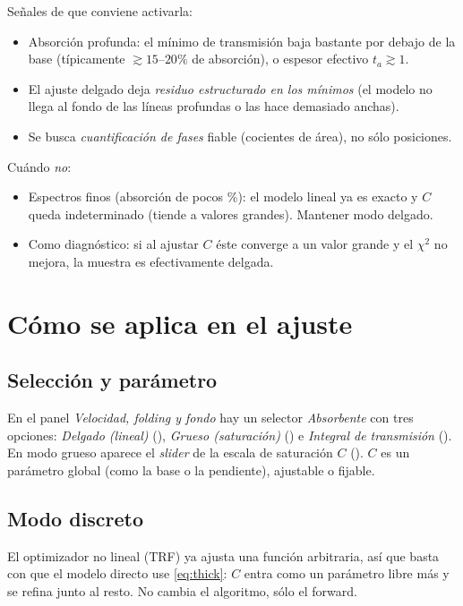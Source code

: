Señales de que conviene activarla:
\begin{itemize}[leftmargin=*]
  \item Absorción profunda: el mínimo de transmisión baja bastante por debajo de
        la base (típicamente $\gtrsim 15$–$20\%$ de absorción), o espesor efectivo
        $t_a\gtrsim 1$.
  \item El ajuste delgado deja \emph{residuo estructurado en los mínimos} (el
        modelo no llega al fondo de las líneas profundas o las hace demasiado
        anchas).
  \item Se busca \emph{cuantificación de fases} fiable (cocientes de área), no
        sólo posiciones.
\end{itemize}
Cuándo \emph{no}:
\begin{itemize}[leftmargin=*]
  \item Espectros finos (absorción de pocos \%): el modelo lineal ya es exacto y
        $C$ queda indeterminado (tiende a valores grandes). Mantener modo delgado.
  \item Como diagnóstico: si al ajustar $C$ éste converge a un valor grande y el
        $\chi^2$ no mejora, la muestra es efectivamente delgada.
\end{itemize}

\section{Cómo se aplica en el ajuste}

\subsection{Selección y parámetro}
En el panel \emph{Velocidad, folding y fondo} hay un selector \emph{Absorbente}
con tres opciones: \emph{Delgado (lineal)} (), \emph{Grueso (saturación)}
() e \emph{Integral de transmisión} (). En modo
grueso aparece el \emph{slider} de la escala de saturación $C$
(). $C$ es un parámetro global
(como la base o la pendiente), ajustable o fijable.

\subsection{Modo discreto}
El optimizador no lineal (TRF) ya ajusta una función arbitraria, así que basta
con que el modelo directo use \eqref{eq:thick}: $C$ entra como un parámetro libre
más y se refina junto al resto. No cambia el algoritmo, sólo el forward.

